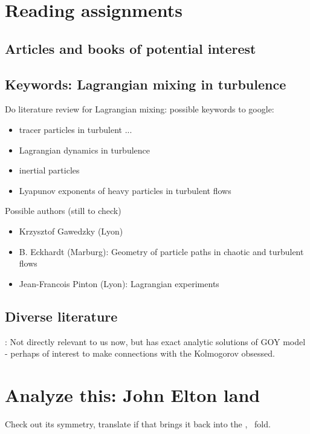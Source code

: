\section{Reading assignments}

\subsection{Articles and books of potential interest}


\subsection{Keywords: Lagrangian mixing in turbulence}

Do literature review for Lagrangian mixing: possible keywords
to google:
\begin{itemize}
\item
    tracer particles in turbulent ...
\item
    Lagrangian dynamics in turbulence
\item
    inertial particles
\item
    Lyapunov exponents of heavy particles in turbulent flows
\end{itemize}

Possible authors (still to check)
\begin{itemize}
\item
Krzysztof Gawedzky (Lyon)
\item
    B. Eckhardt (Marburg):
Geometry of particle paths in chaotic and turbulent flows
\item
    Jean-Francois Pinton (Lyon): Lagrangian experiments
\end{itemize}


\subsection{Diverse literature}


:
Not directly relevant to us now,
but  has exact analytic
solutions of GOY model - perhaps of interest to make connections
with the Kolmogorov obsessed.


\section{Analyze this: John Elton land}

Check out its symmetry, translate if that brings it back into the
\uUB, \uNB\ fold.


